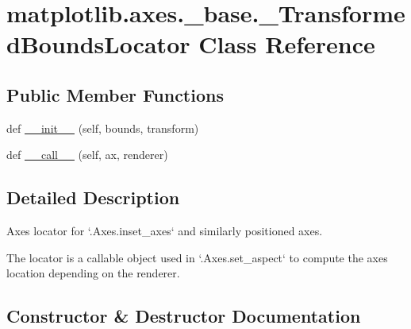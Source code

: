 \hypertarget{classmatplotlib_1_1axes_1_1__base_1_1__TransformedBoundsLocator}{}\section{matplotlib.\+axes.\+\_\+base.\+\_\+\+Transformed\+Bounds\+Locator Class Reference}
\label{classmatplotlib_1_1axes_1_1__base_1_1__TransformedBoundsLocator}
\subsection*{Public Member Functions}
\begin{DoxyCompactItemize}
\item 
def \hyperlink{classmatplotlib_1_1axes_1_1__base_1_1__TransformedBoundsLocator_ac1d998de347b480612f408d3cf177d25}{\+\_\+\+\_\+init\+\_\+\+\_\+} (self, bounds, transform)
\item 
def \hyperlink{classmatplotlib_1_1axes_1_1__base_1_1__TransformedBoundsLocator_a6b56c02adb39fe18f5d69473e03efbf9}{\+\_\+\+\_\+call\+\_\+\+\_\+} (self, ax, renderer)
\end{DoxyCompactItemize}


\subsection{Detailed Description}
\begin{DoxyVerb}Axes locator for `.Axes.inset_axes` and similarly positioned axes.

The locator is a callable object used in `.Axes.set_aspect` to compute the
axes location depending on the renderer.
\end{DoxyVerb}
 

\subsection{Constructor \& Destructor Documentation}
\mbox{\label{classmatplotlib_1_1axes_1_1__base_1_1__TransformedBoundsLocator_ac1d998de347b480612f408d3cf177d25}} 
